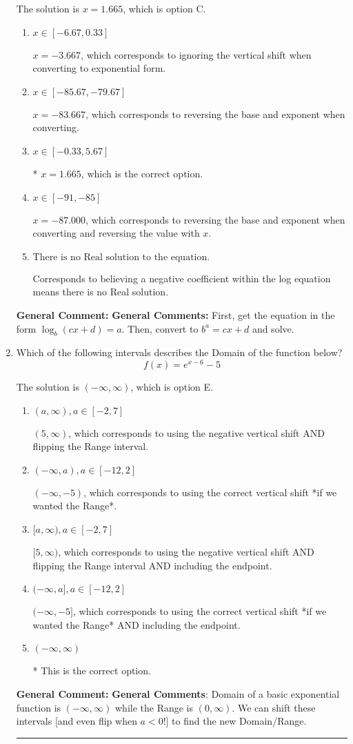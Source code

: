 \documentclass{extbook}[14pt]
\newcommand{\litem}[1]{\item #1

\rule{\textwidth}{0.4pt}}
\begin{document}
\begin{enumerate}
{The solution is \( x = 1.665 \), which is option C.\begin{enumerate}[label=\Alph*.]
\item \( x \in [-6.67, 0.33] \)

$x = -3.667$, which corresponds to ignoring the vertical shift when converting to exponential form.
\item \( x \in [-85.67, -79.67] \)

$x = -83.667$, which corresponds to reversing the base and exponent when converting.
\item \( x \in [-0.33, 5.67] \)

* $x = 1.665$, which is the correct option.
\item \( x \in [-91, -85] \)

$x = -87.000$, which corresponds to reversing the base and exponent when converting and reversing the value with $x$.
\item \( \text{There is no Real solution to the equation.} \)

Corresponds to believing a negative coefficient within the log equation means there is no Real solution.
\end{enumerate}

\textbf{General Comment:} \textbf{General Comments:} First, get the equation in the form $\log_b{(cx+d)} = a$. Then, convert to $b^a = cx+d$ and solve.
}
\litem{
Which of the following intervals describes the Domain of the function below?
\[ f(x) = e^{x-6}-5 \]

The solution is \( (-\infty, \infty) \), which is option E.\begin{enumerate}[label=\Alph*.]
\item \( (a, \infty), a \in [-2, 7] \)

$(5, \infty)$, which corresponds to using the negative vertical shift AND flipping the Range interval.
\item \( (-\infty, a), a \in [-12, 2] \)

$(-\infty, -5)$, which corresponds to using the correct vertical shift *if we wanted the Range*.
\item \( [a, \infty), a \in [-2, 7] \)

$[5, \infty)$, which corresponds to using the negative vertical shift AND flipping the Range interval AND including the endpoint.
\item \( (-\infty, a], a \in [-12, 2] \)

$(-\infty, -5]$, which corresponds to using the correct vertical shift *if we wanted the Range* AND including the endpoint.
\item \( (-\infty, \infty) \)

* This is the correct option.
\end{enumerate}

\textbf{General Comment:} \textbf{General Comments}: Domain of a basic exponential function is $(-\infty, \infty)$ while the Range is $(0, \infty)$. We can shift these intervals [and even flip when $a<0$!] to find the new Domain/Range.
}
\end{enumerate}
\end{document}
